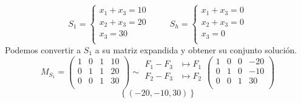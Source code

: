 \documentclass{article}
\begin{document}
\begin{enumerate}
\begin{enumerate}[label=\listAlph]
\[                    S_1 = 
                    \left\{
                        \begin{aligned}
                            x_1 + x_3 = 10 \\
                            x_2 + x_3 = 20 \\
                            x_3 = 30 \\
                        \end{aligned}
                    \right.
                    \hspace{1cm}
                    S_h = 
                    \left\{
                        \begin{aligned}
                            x_1 + x_3 = 0 \\
                            x_2 + x_3 = 0 \\
                            x_3 = 0 \\
                        \end{aligned}
                    \right.
                \]
                Podemos convertir a \(S_1\) a su matriz expandida y obtener su conjunto solución.
                \[
                    M_{S_{1}} =
                    \left(
                    \begin{array}{ccc|c}
                        1 & 0 & 1 & 10 \\
                        0 & 1 & 1 & 20 \\
                        0 & 0 & 1 & 30 \\
                    \end{array}
                    \right)
                    \sim
                    \begin{aligned}
                        F_1 - F_3 &\mapsto F_1 \\
                        F_2 - F_3 &\mapsto F_2 \\
                    \end{aligned}
                    \left(
                    \begin{array}{ccc|c}
                        1 & 0 & 0 & -20 \\
                        0 & 1 & 0 & -10 \\
                        0 & 0 & 1 & 30 \\
                    \end{array}
                    \right)
                \]
                \[
                    \left\{\left(-20, -10, 30\right)\right\}
                \]

\end{enumerate}
\end{enumerate}
\end{document}
